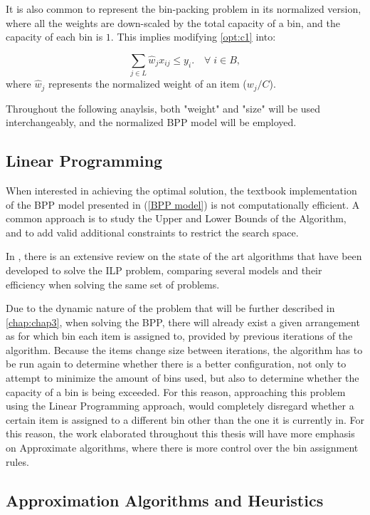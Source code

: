 It is also common to represent the bin-packing problem in its normalized
version, where all the weights are down-scaled by the total capacity of a bin,
and the capacity of each bin is $1$. This implies modifying \ref{opt:c1} into:

\begin{equation}
    \sum_{j \in L} \hat w_j x_{ij} \leq y_i. \quad \forall \; i \in B,
\end{equation}
where \(\hat w_j\) represents the normalized weight of an item ($w_j/C$).

Throughout the following anaylsis, both "weight" and "size" will be used
interchangeably, and the normalized BPP model will be employed.

\subsection{Linear Programming}

When interested in achieving the optimal solution, the textbook implementation of the BPP model presented in (\ref{BPP model}) is not computationally efficient. A common approach is to study the Upper and Lower Bounds of the Algorithm, and to add valid additional constraints to restrict the search space.

In \cite{delorme2016bin}, there is an extensive review on the state of the art algorithms that have been developed to solve the ILP problem, comparing several models and their efficiency when solving the same set of problems. 

Due to the dynamic nature of the problem that will be further described in \ref{chap:chap3}, when solving the BPP, there will already exist a given arrangement as for which bin each item is assigned to, provided by previous iterations of the algorithm. Because the items change size between iterations, the algorithm has to be run again to determine whether there is a better configuration, not only to attempt to minimize the amount of bins used, but also to determine whether the capacity of a bin is being exceeded. For this reason, approaching this problem using the Linear Programming approach, would completely disregard whether a certain item is assigned to a different bin other than the one it is currently in. For this reason, the work elaborated throughout this thesis will have more emphasis on Approximate algorithms, where there is more control over the bin assignment rules.

\subsection{Approximation Algorithms and Heuristics}
\label{sub:Approximation Algorithms and Heuristics}

